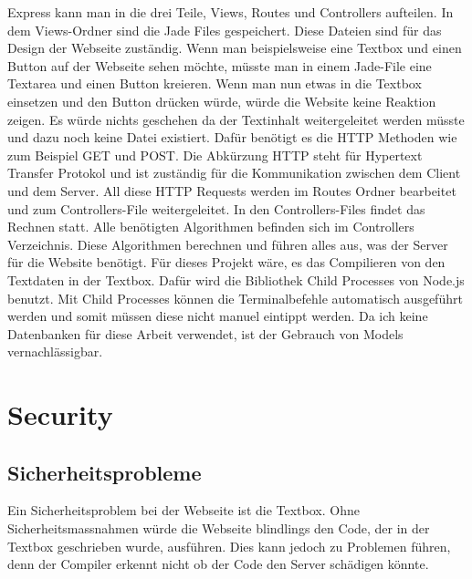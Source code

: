 \documentclass[10pt]{article}
\begin{document}
Express kann man in die drei Teile, Views, Routes und Controllers aufteilen. In dem Views-Ordner sind die Jade Files gespeichert. Diese Dateien sind für das Design der Webseite zuständig. Wenn man beispielsweise eine Textbox und einen Button auf der Webseite sehen möchte, müsste man in einem Jade-File eine Textarea und einen Button kreieren. Wenn man nun etwas in die Textbox einsetzen und den Button drücken würde, würde die Website keine Reaktion zeigen. Es würde nichts geschehen da der Textinhalt weitergeleitet werden müsste und dazu noch keine Datei existiert. Dafür benötigt es die HTTP Methoden wie zum Beispiel GET und POST. Die Abkürzung HTTP steht für Hypertext Transfer Protokol und ist zuständig für die Kommunikation zwischen dem Client und dem Server.\cite{httpmethods} All diese HTTP Requests werden im Routes Ordner bearbeitet und zum Controllers-File weitergeleitet. In den Controllers-Files findet das Rechnen statt.  Alle benötigten Algorithmen befinden sich im Controllers Verzeichnis. Diese Algorithmen berechnen und führen alles aus, was der Server für die Website benötigt. Für dieses Projekt wäre, es das Compilieren von den Textdaten in der Textbox. Dafür wird die Bibliothek  Child Processes  von Node.js benutzt. Mit Child Processes können die Terminalbefehle automatisch ausgeführt werden und somit müssen diese nicht manuel eintippt werden. Da ich keine Datenbanken für diese Arbeit verwendet, ist der Gebrauch von Models vernachlässigbar. 

	
	\pagebreak
	\section{Security}
	\subsection{Sicherheitsprobleme}
		Ein Sicherheitsproblem bei der Webseite ist die Textbox. Ohne Sicherheitsmassnahmen würde die Webseite blindlings den Code, der in der Textbox geschrieben wurde, ausführen. Dies kann jedoch zu Problemen führen, denn der Compiler erkennt nicht ob der Code den Server schädigen könnte. 
		
\end{document}
